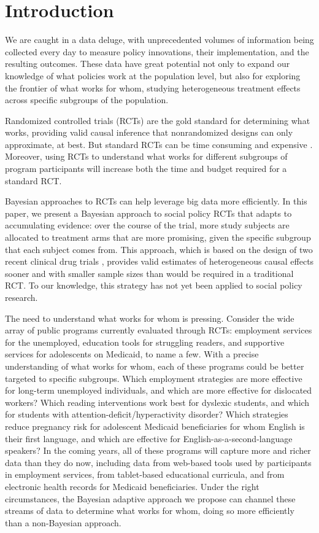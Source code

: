 \documentclass{acm_proc_article-sp}
\begin{document}
\section{Introduction}
We are caught in a data deluge, with unprecedented volumes of information being collected every day to measure policy innovations, their implementation, and the resulting outcomes. 
These data have great potential not only to expand our knowledge of what policies work at the population level, but also for exploring the frontier of what works for whom, studying heterogeneous treatment effects across specific subgroups of the population.

Randomized controlled trials (RCTs) are the gold standard for determining what works, providing valid causal inference that nonrandomized designs can only approximate, at best. But standard RCTs can be time consuming and expensive \cite{luce2009rethinking}. 
Moreover, using RCTs to understand what works for different subgroups of program participants will increase both the time and budget required for a standard RCT. 

Bayesian approaches to RCTs can help leverage big data more efficiently. 
In this paper, we present a Bayesian approach to social policy RCTs that adapts to accumulating evidence: over the course of the trial, more study subjects are allocated to treatment arms that are more promising, given the specific subgroup that each subject comes from. 
This approach, which is based on the design of two recent clinical drug trials \cite{barker2009spy, kim2011battle}, provides valid estimates of heterogeneous causal effects sooner and with smaller sample sizes than would be required in a traditional RCT. 
To our knowledge, this strategy has not yet been applied to social policy research. 

The need to understand what works for whom is pressing. 
Consider the wide array of public programs currently evaluated through RCTs: employment services for the unemployed, education tools for struggling readers, and supportive services for adolescents on Medicaid, to name a few. With a precise understanding of what works for whom, each of these programs could be better targeted to specific subgroups. 
Which employment strategies are more effective for long-term unemployed individuals, and which are more effective for dislocated workers? 
Which reading interventions work best for dyslexic students, and which for students with attention-deficit/hyperactivity disorder? 
Which strategies reduce pregnancy risk for adolescent Medicaid beneficiaries for whom English is their first language, and which are effective for English-as-a-second-language speakers? 
In the coming years, all of these programs will capture more and richer data than they do now, including data from web-based tools used by participants in employment services, from tablet-based educational curricula, and from electronic health records for Medicaid beneficiaries. 
Under the right circumstances, the Bayesian adaptive approach we propose can channel these streams of data to determine what works for whom, doing so more efficiently than a non-Bayesian approach.
\end{document}
